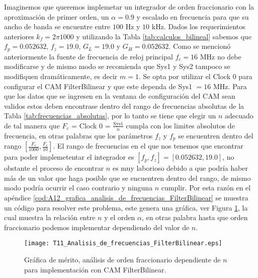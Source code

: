 	Imaginemos que queremos implemetar un integrador de orden fraccionario con la aproximación de primer orden, un $\alpha = 0.9$ y escalado en frecuencia para que su ancho de banda se encuentre entre $100$ Hz y $10$ kHz. Dados los requerimientos anteriores $k_{f} = 2 \pi 1000$ y utilizando la Tabla \ref{tab:calculos_bilineal} sabemos que $f_{p} = 0.052632$, $f_{z} = 19.0$, $G_{L} = 19.0$ y $G_{H} = 0.052632$. Como se mencionó anteriormente la fuente de frecuencia de reloj principal $f_{c} = 16$ MHz no debe modificarse y de mismo modo se recomienda que Sys1 y Sys2 tampoco se modifiquen dramáticamente, es decir $m = 1$. Se opta por utilizar el Clock 0 para configurar el CAM FilterBilinear y que este dependa de Sys1 $=16$ MHz. Para que los datos que se ingresen en la ventana de configuración del CAM sean validos estos deben encontrase dentro del rango de frecuencias absolutas de la Tabla \ref{tab:frecuencias_absolutas}, por lo tanto se tiene que elegir un $n$ adecuado de tal manera que $F_{c}$ = Clock 0 = $\frac{\mathrm{Sys1}}{n}$ cumpla con los limites absolutos de frecuencia, en otras palabras que los parámetros $f_{z}$ y $f_{p}$ se encuentren dentro del rango $[\frac{F_{c}}{1000}, \frac{F_{c}}{10}]$. El rango de frecuencias en el que nos tenemos que encontrar para poder implemetentar el integrador es $[f_{p},f_{z}] = [0.052632, 19.0]$, no obstante el proceso de encontrar $n$ es muy laborioso debido a que podría haber más de un valor que haga posible que se encuentren dentro del rango, de mismo modo podría ocurrir el caso contrario y ninguna $n$ cumplir. Por esta razón en el apéndice \ref{cod:A12_grafica_analisis_de_frecuencias_FilterBilinear} se muestra un código para resolver este problema, este genera una gráfica, ver Figura \ref{fig:T11_Analisis_de_frecuencias_FilterBilinear}, la cual muestra la relación entre $n$ y el orden $\alpha$, en otras palabra hasta que orden fraccionario podemos implementar dependiendo del valor de $n$.

	\begin{figure}[hbtp]
		\caption{Gráfica de mérito, análisis de orden fraccionario dependiente de $n$ para implementación con CAM FilterBilinear.} 
		\label{fig:T11_Analisis_de_frecuencias_FilterBilinear}
		\centering
		\texttt{[image: T11\_Analisis\_de\_frecuencias\_FilterBilinear.eps]}
	\end{figure}

